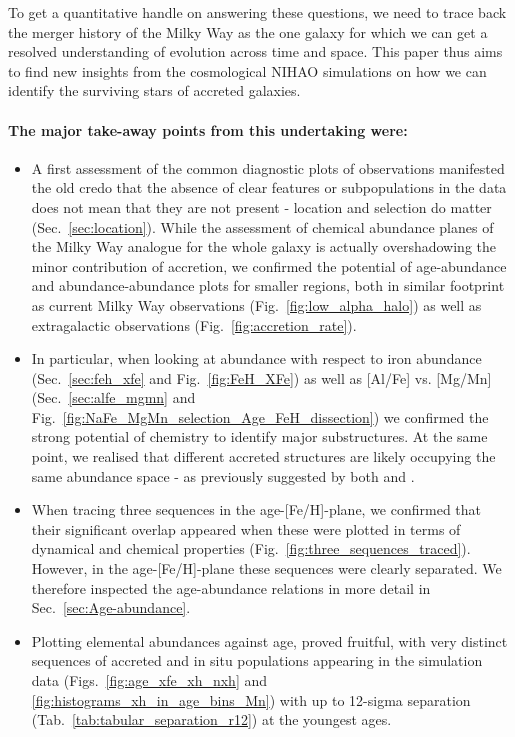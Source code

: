 \documentclass[fleqn,usenatbib]{mnras}
\begin{document}
To get a quantitative handle on answering these questions, we need to trace back the merger history of the Milky Way as the one galaxy for which we can get a resolved understanding of evolution across time and space. This paper thus aims to find new insights from the cosmological \textsc{NIHAO} simulations on how we can identify the surviving stars of accreted galaxies.

\paragraph*{The major take-away points from this undertaking were:}
\begin{itemize}
    \item A first assessment of the common diagnostic plots of observations manifested the old credo that the absence of clear features or subpopulations in the data does not mean that they are not present - location and selection do matter (Sec.~\ref{sec:location}). While the assessment of chemical abundance planes of the Milky Way analogue for the whole galaxy is actually overshadowing the minor contribution of accretion, we confirmed the potential of age-abundance and abundance-abundance plots for smaller regions, both in similar footprint as current Milky Way observations (Fig.~\ref{fig:low_alpha_halo}) as well as extragalactic observations (Fig.~\ref{fig:accretion_rate}).
    \item In particular, when looking at abundance with respect to iron abundance (Sec.~\ref{sec:feh_xfe} and Fig.~\ref{fig:FeH_XFe}) as well as [Al/Fe] vs. [Mg/Mn] (Sec.~\ref{sec:alfe_mgmn} and Fig.~\ref{fig:NaFe_MgMn_selection_Age_FeH_dissection}) we confirmed the strong potential of chemistry to identify major substructures. At the same point, we realised that different accreted structures are likely occupying the same abundance space - as previously suggested by both \citet{Horta2021} and \citet{Rey2023}.
    \item When tracing three sequences in the age-[Fe/H]-plane, we confirmed that their significant overlap appeared when these were plotted in terms of dynamical and chemical properties (Fig.~\ref{fig:three_sequences_traced}). However, in the age-[Fe/H]-plane these sequences were clearly separated. We therefore inspected the age-abundance relations in more detail in Sec.~\ref{sec:Age-abundance}. 
    \item Plotting elemental abundances against age, proved fruitful, with very distinct sequences of accreted and in situ populations appearing in the simulation data (Figs.~\ref{fig:age_xfe_xh_nxh} and \ref{fig:histograms_xh_in_age_bins_Mn}) with up to 12-sigma separation (Tab.~\ref{tab:tabular_separation_r12}) at the youngest ages.

\end{itemize}
\end{document}
